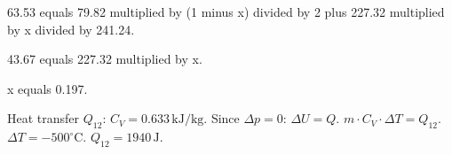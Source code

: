 63.53 equals 79.82 multiplied by (1 minus x) divided by 2 plus 227.32 multiplied by x divided by 241.24.  

43.67 equals 227.32 multiplied by x.  

x equals 0.197.

Heat transfer \( Q_{12} \):  
\( C_V = 0.633 \, \text{kJ/kg} \).  
Since \( \Delta p = 0 \):  
\( \Delta U = Q \).  
\( m \cdot C_V \cdot \Delta T = Q_{12} \).  
\( \Delta T = -500^\circ \text{C} \).  
\( Q_{12} = 1940 \, \text{J} \).